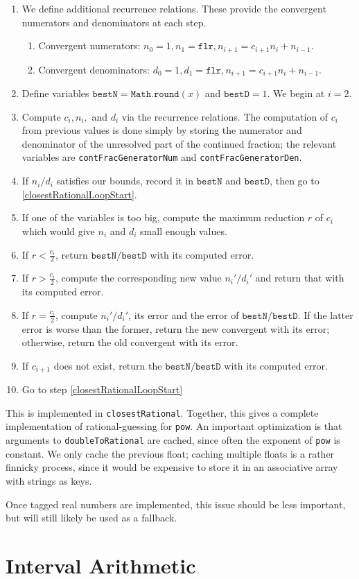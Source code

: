 \documentclass{article}
\begin{document}
\begin{enumerate}[label=(\alph*)]
  \item We define additional recurrence relations. These provide the convergent numerators and denominators at each step. \begin{enumerate}
    \item Convergent numerators: $n_0 = 1, n_1 = \texttt{flr}, n_{i+1} = c_{i+1}n_i + n_{i-1}$.
    \item Convergent denominators: $d_0 = 1, d_1 = \texttt{flr}, n_{i+1} = c_{i+1}n_i + n_{i-1}$.
\end{enumerate}
  \item Define variables $\texttt{bestN}=\texttt{Math.round}(x)$ and $\texttt{bestD}=1$. We begin at $i=2$.
  \item Compute $c_i, n_i,$ and $d_i$ via the recurrence relations. The computation of $c_i$ from previous values is done simply by storing the numerator and denominator of the unresolved part of the continued fraction; the relevant variables are \texttt{contFracGeneratorNum} and \texttt{contFracGeneratorDen}. \label{closestRationalLoopStart}
  \item If $n_i/d_i$ satisfies our bounds, record it in $\texttt{bestN}$ and $\texttt{bestD}$, then go to \ref{closestRationalLoopStart}.
  \item If one of the variables is too big, compute the maximum reduction $r$ of $c_i$ which would give $n_i$ and $d_i$ small enough values.
  \item If $r < \frac{c_i}{2}$, return $\texttt{bestN}/\texttt{bestD}$ with its computed error.
  \item If $r > \frac{c_i}{2}$, compute the corresponding new value $n_i'/d_i'$ and return that with its computed error.
  \item If $r = \frac{c_i}{2}$, compute $n_i'/d_i'$, its error and the error of $\texttt{bestN}/\texttt{bestD}$. If the latter error is worse than the former, return the new convergent with its error; otherwise, return the old convergent with its error.
  \item If $c_{i+1}$ does not exist, return the $\texttt{bestN}/\texttt{bestD}$ with its computed error.
  \item Go to step \ref{closestRationalLoopStart}
\end{enumerate}

This is implemented in \texttt{closestRational}. Together, this gives a complete implementation of rational-guessing for \texttt{pow}. An important optimization is that arguments to \texttt{doubleToRational} are cached, since often the exponent of \texttt{pow} is constant. We only cache the previous float; caching multiple floats is a rather finnicky process, since it would be expensive to store it in an associative array with strings as keys.

Once tagged real numbers are implemented, this issue should be less important, but will still likely be used as a fallback.

\section{Interval Arithmetic}
\end{document}
